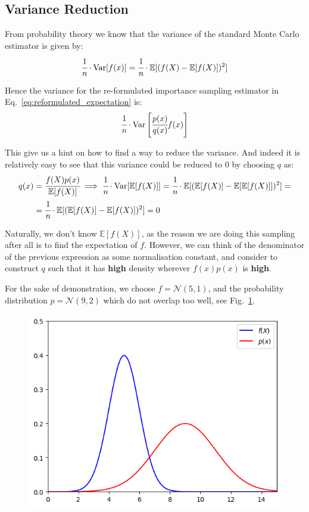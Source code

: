 \documentclass[12pt,a4paper]{book}
\begin{document}
\subsection{Variance Reduction}
From probability theory we know that the variance of the standard Monte Carlo estimator is given by:
\begin{equation}
\cfrac{1}{n}\cdot\text{Var}[f(x)] = \cfrac{1}{n}\cdot\mathbb{E}[(f(X)-\mathbb{E}[f(X)])^2]
\end{equation}

Hence the variance for the re-formulated importance sampling estimator in Eq.~\ref{eq:reformulated_expectation} is:
\begin{equation}
\cfrac{1}{n}\cdot\text{Var}\left[\cfrac{p(x)}{q(x)}f(x)\right]
\end{equation}

This give us a hint on how to find a way to reduce the variance. And indeed it is relatively easy to see that this variance could be reduced to 0 by choosing $q$ as:
\begin{equation}
\begin{aligned}
q(x)&=\cfrac{f(X)p(x)}{\mathbb{E}[f(X)]} \implies \cfrac{1}{n}\cdot\text{Var}[\mathbb{E}[f(X)]] = \cfrac{1}{n}\cdot\mathbb{E}[(\mathbb{E}[f(X)]-\mathbb{E}[\mathbb{E}[f(X)]])^2]=\\
&=\cfrac{1}{n}\cdot\mathbb{E}[(\mathbb{E}[f(X)]-\mathbb{E}[f(X)])^2] = 0
\end{aligned}
\end{equation}

Naturally, we don’t know $\mathbb{E}[f(X)]$, as the reason we are doing this sampling after all is to find the expectation of $f$.
However, we can think of the denominator of the previous expression as some normalisation constant, and consider to construct $q$ such that it has \textbf{high} density wherever $f(x)p(x)$ is \textbf{high}.

For the sake of demonstration, we choose $f=\mathcal{N}(5, 1)$, and the probability distribution $p=\mathcal{N}(9,2)$ which do not overlap too well, see Fig.~\ref{fig:f_and_p}.
\begin{figure}[htbp]
\begin{center}
\includegraphics[width=0.5\linewidth]{addons/f_and_p}
\end{center}
\label{fig:f_and_p}
\end{figure}
\end{document}
